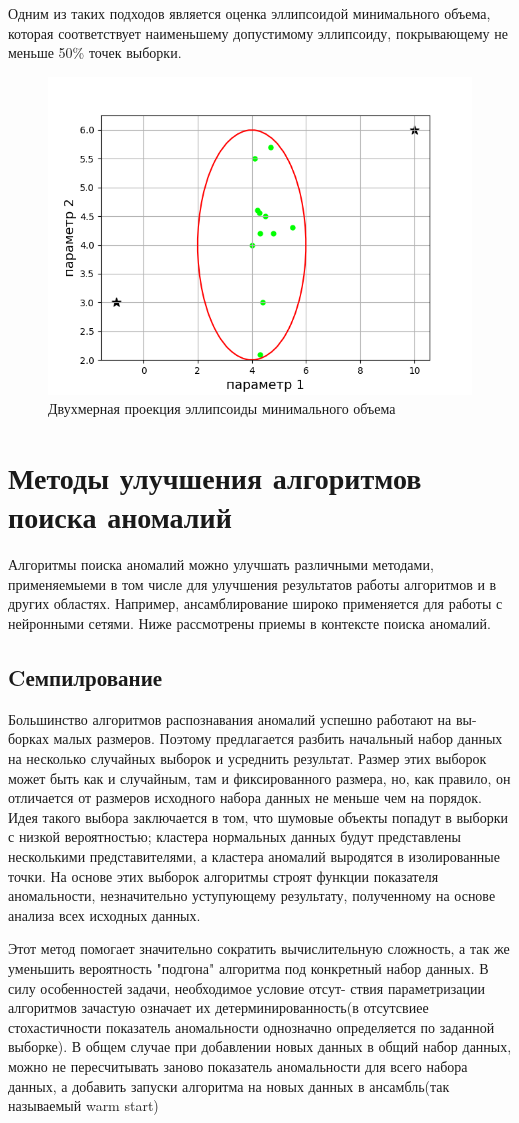 Одним из таких подходов является оценка эллипсоидой минимального объема\cite{Book11}, которая соответствует наименьшему допустимому эллипсоиду, покрывающему не меньше 50\% точек выборки.
\begin{figure}
	\centering
	\includegraphics[width=.5\textwidth]{img/4_1.png}
	\caption{Двухмерная проекция эллипсоиды минимального объема}
	\label{fig04}
\end{figure}


\section{Методы улучшения алгоритмов поиска аномалий}
Алгоритмы поиска аномалий можно улучшать различными методами, применяемыеми в том числе для  улучшения результатов работы алгоритмов и в других областях. Например, ансамблирование широко применяется для работы с нейронными сетями. Ниже рассмотрены приемы в контексте поиска аномалий.
\subsection{Cемпилрование}
Большинство алгоритмов распознавания аномалий успешно работают на вы-
борках малых размеров. Поэтому предлагается разбить начальный набор данных на несколько случайных выборок и усреднить результат. Размер этих выборок может быть как и случайным, там и фиксированного размера, но, как правило, он отличается от размеров исходного набора данных не меньше чем на порядок. Идея такого выбора заключается в том, что шумовые объекты попадут в выборки с низкой вероятностью; кластера нормальных данных будут представлены несколькими представителями, а кластера аномалий выродятся в изолированные точки. На основе этих выборок алгоритмы строят функции показателя аномальности, незначительно уступующему результату, полученному на основе анализа всех исходных данных. 

Этот метод помогает значительно сократить вычислительную сложность, а так же уменьшить вероятность "подгона" алгоритма под конкретный набор данных.  В силу особенностей задачи, необходимое условие отсут-
ствия параметризации алгоритмов зачастую означает их детерминированность(в отсутсвиее стохастичности показатель аномальности однозначно определяется по  заданной выборке). В общем случае при добавлении новых данных в общий набор данных, можно не пересчитывать заново показатель аномальности для всего набора данных, а добавить запуски алгоритма на новых данных в ансамбль(так называемый warm start\cite{Book15})
